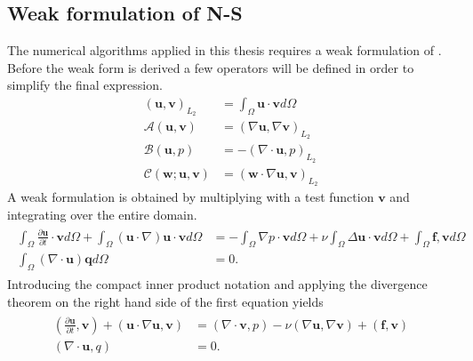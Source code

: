 \subsection{Weak formulation of N-S}
The numerical algorithms applied in this thesis requires a weak formulation of .
Before the weak form is derived a few operators will be defined in order to simplify the final 
expression.
%
\begin{align}
    ( \mathbf{u},\mathbf{v})_{L_2} &= \int_{\Omega}\mathbf{u} \cdot \mathbf{v} d\Omega\\
    \mathcal{A}(\mathbf{u},\mathbf{v}) &= (\nabla \mathbf{u},\nabla \mathbf{v})_{L_2}\\
    \mathcal{B}(\mathbf{u},p) &= -(\nabla \cdot \mathbf{u},p)_{L_2}\\
    \mathcal{C}(\mathbf{w};\mathbf{u},\mathbf{v}) &= (\mathbf{w}\cdot \nabla \mathbf{u},\mathbf{v})_{L_2}
    \label{eq:weakoperators}
\end{align}
%
A weak formulation is obtained by multiplying with a test function $\mathbf{v}$ and integrating over
the entire domain.
\begin{align}
    \begin{split}
        \int_{\Omega}\frac{\partial \mathbf{u}}{\partial t}\cdot\mathbf{v}d\Omega
        + \int_{\Omega}(\mathbf{u}\cdot \nabla)\mathbf{u}\cdot\mathbf{v}d\Omega
        &= -\int_{\Omega}\nabla p\cdot \mathbf{v} d\Omega 
        + \nu \int_{\Omega}\Delta\mathbf{u}\cdot\mathbf{v}d\Omega
        + \int_{\Omega}\mathbf{f},\mathbf{v}d\Omega \\
		\int_{\Omega}(\nabla \cdot \mathbf{u}) \mathbf{q}d\Omega &= 0.
    \end{split}
	\label{eq:NSweak1}
\end{align}
Introducing the compact inner product notation and applying the divergence theorem on the right hand side of 
the first equation yields
\begin{align}
    \begin{split}
        (\frac{\partial \mathbf{u}}{\partial t},\mathbf{v})
        + (\mathbf{u}\cdot \nabla\mathbf{u},\mathbf{v})
        &= (\nabla \cdot \mathbf{v} , p ) 
        -\nu(\nabla \mathbf{u},\nabla \mathbf{v})
        + (\mathbf{f},\mathbf{v}) \\
		(\nabla \cdot \mathbf{u},q) &= 0.
    \end{split}
	\label{eq:NSweak}
\end{align}
